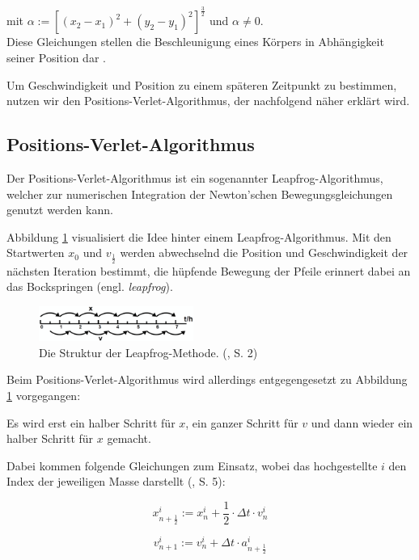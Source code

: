 \documentclass[10pt,twocolumn]{scrartcl}
\begin{document}
mit $\alpha := [(x_2-x_1)^2 + (y_2-y_1)^2]^\frac{3}{2}$ und $\alpha \neq 0$.\\

Diese Gleichungen stellen die Beschleunigung eines Körpers in Abhängigkeit seiner Position dar \cite{MicrosoftOJ}.

Um Geschwindigkeit und Position zu einem späteren Zeitpunkt zu bestimmen, nutzen wir den Positions-Verlet-Algorithmus, der nachfolgend näher erklärt wird.


\subsection{Positions-Verlet-Algorithmus}
Der Positions-Verlet-Algorithmus ist ein sogenannter Leapfrog-Algorithmus, welcher zur numerischen Integration der Newton'schen Bewegungsgleichungen genutzt werden kann.

Abbildung \ref{fig:leapfrog} visualisiert die Idee hinter einem Leapfrog-Algorithmus. Mit den Startwerten $x_0$ und $v_\frac{1}{2}$ werden abwechselnd die Position und Geschwindigkeit der nächsten Iteration bestimmt, die hüpfende Bewegung der Pfeile erinnert dabei an das Bockspringen (engl. {\it leapfrog}).

\begin{figure}[t]
\centering
\includegraphics[width=0.45\textwidth]{Bilder/leapfrog.png}
\caption{Die Struktur der Leapfrog-Methode. (\cite{Young14}, S. 2)}
\label{fig:leapfrog}
\end{figure}

Beim Positions-Verlet-Algorithmus wird allerdings entgegengesetzt zu Abbildung \ref{fig:leapfrog} vorgegangen:

Es wird erst ein halber Schritt für $x$, ein ganzer Schritt für $v$ und dann wieder ein halber Schritt für $x$ gemacht.

Dabei kommen folgende Gleichungen zum Einsatz, wobei das hochgestellte $i$ den Index der jeweiligen Masse darstellt (\cite{Young14}, S. 5):

\begin{equation}x_{n+\frac{1}{2}}^i := x_n^i + \frac{1}{2} \cdot \Delta t \cdot v_n^i
\label{eq:22}
\end{equation}

\begin{equation}v_{n+1}^i := v_n^i + \Delta t \cdot a_{n+\frac{1}{2}}^i
\label{eq:23}
\end{equation}
\end{document}
